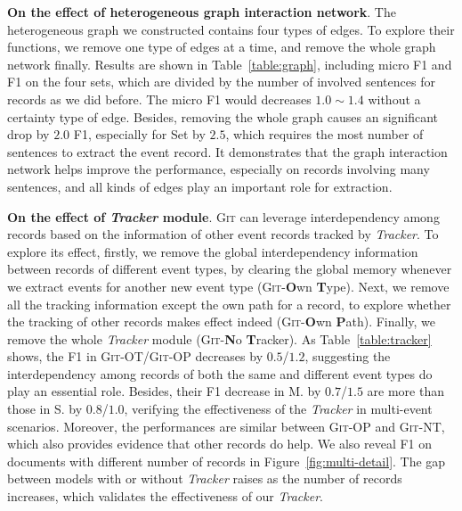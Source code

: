 \documentclass[11pt,a4paper]{article}
\newcommand{\modelname}{\textsc{Git}\xspace}
\begin{document}
\textbf{On the effect of heterogeneous graph interaction network}. 
The heterogeneous graph we constructed contains four types of edges.
To explore their functions, we remove one type of edges at a time, and remove the whole graph network finally.
Results are shown in Table~\ref{table:graph}, including micro F1 and F1 on the four sets, which are divided by the number of involved sentences for records as we did before.
The micro F1 would decreases $1.0\sim1.4$ without a certainty type of edge.
Besides, removing the whole graph causes an significant drop by $2.0$ F1, especially for Set \uppercase\expandafter{} by $2.5$, which requires the most number of sentences to extract the event record.
It demonstrates that the graph interaction network helps improve the performance, especially on records involving many sentences, and all kinds of edges play an important role for extraction.






\textbf{On the effect of \textit{Tracker} module}.
\modelname can leverage interdependency among records based on the information of other event records tracked by \textit{Tracker}.
To explore its effect, firstly, we remove the global interdependency information between records of different event types, by clearing the global memory whenever we extract events for another new event type (\modelname-\textbf{O}wn \textbf{T}ype).
Next, we remove all the tracking information except the own path for a record, to explore whether the tracking of other records makes effect indeed (\modelname-\textbf{O}wn \textbf{P}ath).
Finally, we remove the whole \textit{Tracker} module (\modelname-\textbf{N}o \textbf{T}racker).
As Table~\ref{table:tracker} shows, the F1 in \modelname-OT/\modelname-OP decreases by $0.5$/$1.2$, suggesting the interdependency among records of both the same and different event types do play an essential role.
Besides, their F1 decrease in M. by $0.7$/$1.5$ are more than those in S. by $0.8$/$1.0$, verifying the effectiveness of the \textit{Tracker} in multi-event scenarios.
Moreover, the performances are similar between \modelname-OP and \modelname-NT, which also provides evidence that other records do help.
We also reveal F1 on documents with different number of records in Figure~\ref{fig:multi-detail}.
The gap between models with or without \textit{Tracker} raises as the number of records increases, which validates the effectiveness of our \textit{Tracker}. 
\end{document}
